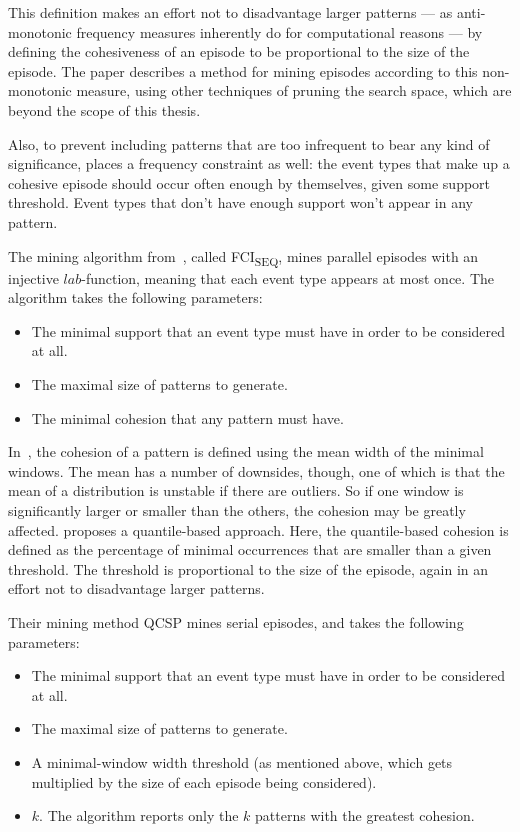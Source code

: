 This definition makes an effort not to disadvantage larger patterns --- as anti-monotonic frequency measures inherently do for computational reasons --- by defining the cohesiveness of an episode to be proportional to the size of the episode. The paper describes a method for mining episodes according to this non-monotonic measure, using other techniques of pruning the search space, which are beyond the scope of this thesis.

Also, to prevent including patterns that are too infrequent to bear any kind of significance, \cite{cule2016efficient} places a frequency constraint as well: the event types that make up a cohesive episode should occur often enough by themselves, given some support threshold. Event types that don't have enough support won't appear in any pattern.

The mining algorithm from~\cite{cule2016efficient}, called FCI\textsubscript{SEQ}, mines parallel episodes with an injective $ lab $-function, meaning that each event type appears at most once. The algorithm takes the following parameters:
\begin{itemize}
\item The minimal support that an event type must have in order to be considered at all.
\item The maximal size of patterns to generate.
\item The minimal cohesion that any pattern must have.
\end{itemize}

In~\cite{cule2016efficient}, the cohesion of a pattern is defined using the mean width of the minimal windows. The mean has a number of downsides, though, one of which is that the mean of a distribution is unstable if there are outliers. So if one window is significantly larger or smaller than the others, the cohesion may be greatly affected. \citep{feremans2018mining} proposes a quantile-based approach. Here, the quantile-based cohesion is defined as the percentage of minimal occurrences that are smaller than a given threshold. The threshold is proportional to the size of the episode, again in an effort not to disadvantage larger patterns.

Their mining method QCSP mines serial episodes, and takes the following parameters:
\begin{itemize}
\item The minimal support that an event type must have in order to be considered at all.
\item The maximal size of patterns to generate.
\item A minimal-window width threshold (as mentioned above, which gets multiplied by the size of each episode being considered).
\item $ k $. The algorithm reports only the $ k $ patterns with the greatest cohesion.
\end{itemize}

